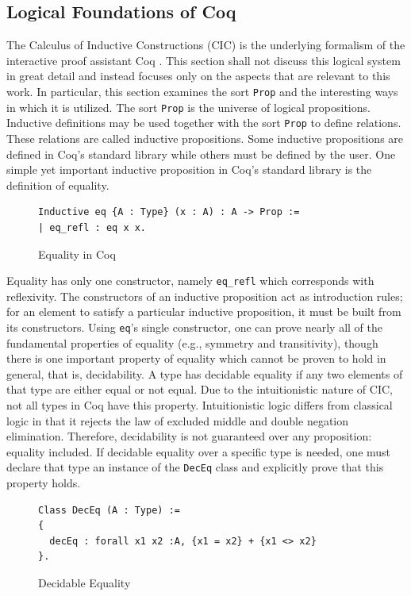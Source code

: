\documentclass[runningheads]{llncs}
\begin{document}
\subsection{Logical Foundations of Coq}
The Calculus of Inductive Constructions (CIC) is the underlying formalism of the interactive proof assistant Coq \cite{CIC}. This section shall not discuss this logical system in great detail and instead focuses only on the aspects that are relevant to this work. In particular, this section examines the sort \verb|Prop| and the interesting ways in which it is utilized. The sort \verb|Prop| is the universe of logical propositions. Inductive definitions may be used together with the sort \verb|Prop| to define relations. These relations are called inductive propositions. Some inductive propositions are defined in Coq's standard library while others must be defined by the user. One simple yet important inductive proposition in Coq's standard library is the definition of equality. 
\begin{figure}[h]
\begin{lstlisting}[language=Coq]
Inductive eq {A : Type} (x : A) : A -> Prop :=
| eq_refl : eq x x.
\end{lstlisting}
\caption{Equality in Coq}
\end{figure}
Equality has only one constructor, namely \verb|eq_refl| which corresponds with reflexivity. The constructors of an inductive proposition act as introduction rules; for an element to satisfy a particular inductive proposition, it must be built from its constructors. Using \verb|eq|'s single constructor, one can prove nearly all of the fundamental properties of equality (e.g., symmetry and transitivity), though there is one important property of equality which cannot be proven to hold in general, that is, decidability. 
A type has decidable equality if any two elements of that type are either equal or not equal. Due to the intuitionistic nature of CIC, not all types in Coq have this property. Intuitionistic logic differs from classical logic in that it rejects the law of excluded middle and double negation elimination. Therefore, decidability is not guaranteed over any proposition: equality included. If decidable equality over a specific type is needed, one must declare that type an instance of the \verb|DecEq| class and explicitly prove that this property holds.
\begin{figure}[h]
\begin{lstlisting}[language=Coq]
Class DecEq (A : Type) := 
{ 
  decEq : forall x1 x2 :A, {x1 = x2} + {x1 <> x2} 
}.
\end{lstlisting}
\caption{Decidable Equality}
\end{figure}
%
%
%
\end{document}
